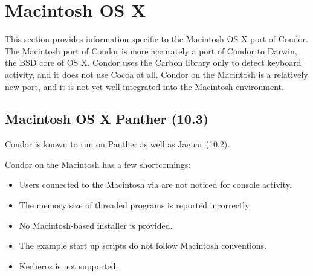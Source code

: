 \section{\label{sec:platform-macos}Macintosh OS X}

This section provides information specific to the Macintosh OS X port of
Condor.
The Macintosh port of Condor is more accurately a port of Condor to
Darwin, the BSD core of OS X. Condor uses the Carbon library only to
detect keyboard activity, and it does not use Cocoa at all.
Condor on the Macintosh is a relatively new port, and it 
is not yet well-integrated
into the Macintosh environment. 
\subsection{\label{sec:platform-macos-panther}Macintosh OS X Panther (10.3)}

Condor \VersionNotice
is known to run on Panther as well
as Jaguar (10.2). 

Condor on the Macintosh has a few shortcomings:
\begin{itemize}
\item Users connected to the Macintosh via  are not
noticed for console activity.
\item The memory size of threaded programs is reported incorrectly.
\item No Macintosh-based installer is provided.
\item The example start up scripts do not follow Macintosh conventions.
\item Kerberos is not supported.
\end{itemize}

